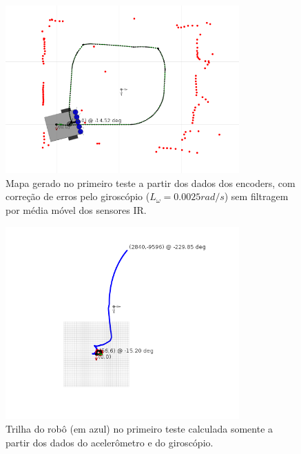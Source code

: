 \begin{figure}[H]
	\centering
	\includegraphics[width=0.8\textwidth]{./figuras/testes/teste1/mapa_encoders_giro_media0.png}
	\caption{Mapa gerado no primeiro teste a partir dos dados dos encoders, com correção de erros pelo giroscópio ($L_\omega = 0.0025 \unit{rad/s}$) sem filtragem por média móvel dos sensores IR.}
	\label{fig:teste1_mapa_encoders_giro_media0}
\end{figure}

\begin{figure}[H]
	\centering
	\includegraphics[width=0.8\textwidth]{./figuras/testes/teste1/mapa_acelerometro.png}
	\caption{Trilha do robô (em azul) no primeiro teste calculada somente a partir dos dados do acelerômetro e do giroscópio.}
	\label{fig:teste1_mapa_acelerometro}
\end{figure}

